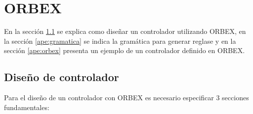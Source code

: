\chapter{ORBEX}

En la sección \ref{ape:diseno} se explica como diseñar un controlador utilizando ORBEX, en la sección \ref{ape:gramatica} se indica la gramática para generar reglase y en la sección \ref{ape:orbex} presenta un ejemplo de un controlador definido en ORBEX. 

\section{Diseño de controlador}
\label{ape:diseno}

Para el diseño de un controlador con \gls{ORBEX} es necesario especificar 3 secciones fundamentales:
